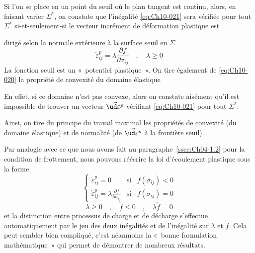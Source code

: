 Si l'on se place en un point du seuil où le plan tangent est continu, alors, en faisant varier $\Sigma^{\ast}$, on constate que l'inégalité \eqref{eq:Ch10-021} sera vérifiée pour tout $\Sigma^{\ast}$ si-et-seulement-si le vecteur incrément de déformation plastique est 
\begin{center}
\end{center}
dirigé selon la normale extérieure à la surface seuil en $\Sigma$ 
\begin{equation}
    \dot{\varepsilon}_{ij}^p = \lambda \frac{\partial f}{\partial \sigma_{ij}} \quad,\quad \lambda \geq 0
    \label{eq:Ch10-022}
\end{equation}
La fonction seuil est un «~potentiel plastique~».
On tire également de \eqref{eq:Ch10-020} la propriété de convexité du domaine élastique 
\begin{multicols}{2}
    \begin{center}
    \end{center}
    \columnbreak
    En effet, si ce domaine n'est pas convexe, alors on constate aisément qu'il est impossible de trouver un vecteur $\vec{\ud \varepsilon^p}$ vérifiant \eqref{eq:Ch10-021} pour tout $\Sigma^{\ast}$.
\end{multicols}
Ainsi, on tire du principe du travail maximal les propriétés de convexité (du domaine élastique) et de normalité (de $\vec{\ud \varepsilon^p}$ à la frontière seuil). 

Par analogie avec ce que nous avons fait au paragraphe~\ref{ssec:Ch04-1.2} pour la condition de frottement, nous pouvons réécrire la loi d'écoulement plastique sous la forme 
\begin{equation}
    \left\{
    \begin{aligned}
        \dot{\varepsilon}_{ij}^p = 0 & \text{si} & f\left( \sigma_{ij} \right) < 0 \\
        \dot{\varepsilon}_{ij}^p = \lambda \frac{\partial f}{\partial \sigma_{ij}} & \text{si} & f\left( \sigma_{ij} \right) = 0
    \end{aligned}
    \right.
    \label{eq:Ch10-023}
\end{equation}
\[
\lambda \geq 0 \quad,\quad \dot{f} \leq 0 \quad,\quad \lambda \dot{f} = 0
\]
et la distinction entre processus de charge et de décharge s'effectue automatiquement par le jeu des deux inégalités et de l'inégalité sur $\lambda$ et $\dot{f}$.
Cela peut sembler bien compliqué, c'est néanmoins la «~bonne formulation mathématique~» qui permet de démontrer de nombreux résultats. 

